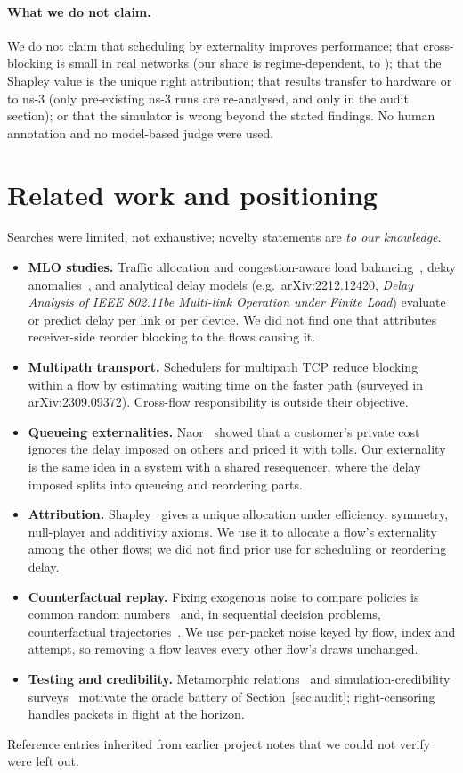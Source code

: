 \documentclass[11pt]{article}
\begin{document}
\paragraph{What we do not claim.} We do not claim that scheduling by externality improves performance; that cross-blocking is small in real networks (our share is regime-dependent, \SBBCrossMin{} to \SBBCrossMax{}); that the Shapley value is the unique right attribution; that results transfer to hardware or to ns-3 (only pre-existing ns-3 runs are re-analysed, and only in the audit section); or that the simulator is wrong beyond the stated findings. No human annotation and no model-based judge were used.

\section{Related work and positioning}
Searches were limited, not exhaustive; novelty statements are \emph{to our knowledge}.
\begin{itemize}
  \item \textbf{MLO studies.} Traffic allocation and congestion-aware load balancing~\cite{lopezraventos2022mlo}, delay anomalies~\cite{carrascosa2023understanding}, and analytical delay models (e.g.\ arXiv:2212.12420, \emph{Delay Analysis of IEEE 802.11be Multi-link Operation under Finite Load}) evaluate or predict delay per link or per device. We did not find one that attributes receiver-side reorder blocking to the flows causing it.
  \item \textbf{Multipath transport.} Schedulers for multipath TCP reduce blocking within a flow by estimating waiting time on the faster path (surveyed in arXiv:2309.09372). Cross-flow responsibility is outside their objective.
  \item \textbf{Queueing externalities.} Naor~\cite{naor1969tolls} showed that a customer's private cost ignores the delay imposed on others and priced it with tolls. Our externality is the same idea in a system with a shared resequencer, where the delay imposed splits into queueing and reordering parts.
  \item \textbf{Attribution.} Shapley~\cite{shapley1953value} gives a unique allocation under efficiency, symmetry, null-player and additivity axioms. We use it to allocate a flow's externality among the other flows; we did not find prior use for scheduling or reordering delay.
  \item \textbf{Counterfactual replay.} Fixing exogenous noise to compare policies is common random numbers~\cite{glasserman1992crn} and, in sequential decision problems, counterfactual trajectories~\cite{oberst2019counterfactual}. We use per-packet noise keyed by flow, index and attempt, so removing a flow leaves every other flow's draws unchanged.
  \item \textbf{Testing and credibility.} Metamorphic relations~\cite{chen2018metamorphic} and simulation-credibility surveys~\cite{kurkowski2005manet} motivate the oracle battery of Section~\ref{sec:audit}; right-censoring~\cite{kaplan1958nonparametric} handles packets in flight at the horizon.
\end{itemize}
Reference entries inherited from earlier project notes that we could not verify were left out.
\end{document}
